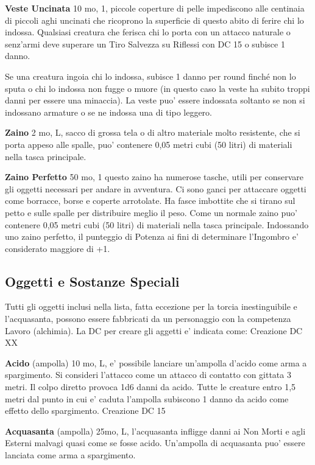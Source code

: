 \documentclass[a4paper,11pt,twoside,openany]{book}
\begin{document}
{\textbf{Veste Uncinata} 10 mo, 1, piccole coperture di pelle impediscono alle centinaia di piccoli aghi uncinati che ricoprono la superficie di questo abito di ferire chi lo indossa. Qualsiasi creatura che ferisca chi lo porta con un attacco naturale o senz'armi deve superare un Tiro Salvezza su Riflessi con DC 15 o subisce 1 danno.

Se una creatura ingoia chi lo indossa, subisce 1 danno per round finché non lo sputa o chi lo indossa non fugge o muore (in questo caso la veste ha subito troppi danni per essere una minaccia). La veste puo' essere indossata soltanto se non si indossano armature o se ne indossa una di tipo leggero.

\textbf{Zaino} 2 mo, L, sacco di grossa tela o di altro materiale molto resistente, che si porta appeso alle spalle, puo' contenere 0,05 metri cubi (50 litri) di materiali nella tasca principale. 

\textbf{Zaino Perfetto} 50 mo, 1 questo zaino ha numerose tasche, utili per conservare gli oggetti necessari per andare in avventura. Ci sono ganci per attaccare oggetti come borracce, borse e coperte arrotolate.
Ha fasce imbottite che si tirano sul petto e sulle spalle per distribuire meglio il peso. Come un normale zaino puo' contenere 0,05 metri cubi (50 litri) di materiali nella tasca principale. Indossando uno zaino perfetto, il punteggio di Potenza ai fini di determinare l'Ingombro e' considerato maggiore di +1.

\subsection{Oggetti e Sostanze Speciali}

\label{oggetti-e-sostanze-speciali}

Tutti gli oggetti inclusi nella lista, fatta eccezione per la torcia inestinguibile e l'acquasanta, possono essere fabbricati da un personaggio con la competenza Lavoro (alchimia). La DC per creare gli aggetti e' indicata come: Creazione DC XX

\textbf{Acido} (ampolla) 10 mo, L, e' possibile lanciare un'ampolla d'acido come arma a spargimento. Si consideri l'attacco come un attacco di contatto con gittata 3 metri. Il colpo diretto provoca 1d6 danni da acido. Tutte le creature entro 1,5 metri dal punto in cui e' caduta l'ampolla subiscono 1 danno da acido come effetto dello spargimento.
Creazione DC 15

\textbf{Acquasanta} (ampolla) 25mo, L, l'acquasanta infligge danni ai Non Morti e agli Esterni malvagi quasi come se fosse acido. Un'ampolla di acquasanta puo' essere lanciata come arma a spargimento.

}
\end{document}
